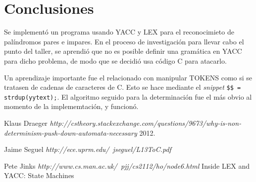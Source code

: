 \documentclass{article}
\begin{document}
\section{Conclusiones}
Se implementó un programa usando YACC y LEX para el reconocimieto de palíndromos pares e impares. En el proceso de investigación para llevar cabo el punto del taller, se aprendió que no es posible definir una gramática en YACC para dicho problema, de modo que se decidió usa código C para atacarlo. 

Un aprendizaje importante fue el relacionado con manipular TOKENS como si se tratasen de cadenas de caracteres de C. Esto se hace mediante el \emph{snippet} \lstinline|$$ = strdup(yytext);|. El algoritmo seguido para la determinación fue el más obvio al momento de la implememtación, y funcionó.


 \begin{thebibliography}{1}

   Klaus Draeger {\em http://cstheory.stackexchange.com/questions/9673/why-is-non-determinism-push-down-automata-necessary}  2012.

    Jaime Seguel {\em http://ece.uprm.edu/~jseguel/L13ToC.pdf}

   Pete Jinks {\em http://www.cs.man.ac.uk/~pjj/cs2112/ho/node6.html}	 Inside LEX and YACC: State Machines 

  \end{thebibliography}
\end{document}
